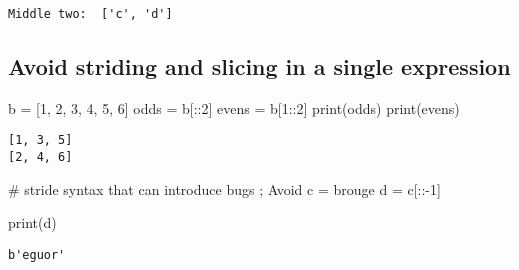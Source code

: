 \documentclass[
]{report}
\newenvironment{Shaded}{\begin{snugshade}}{\end{snugshade}}
\newcommand{\BuiltInTok}[1]{\textcolor[rgb]{0.00,0.23,0.31}{#1}}
\newcommand{\CommentTok}[1]{\textcolor[rgb]{0.37,0.37,0.37}{#1}}
\newcommand{\DecValTok}[1]{\textcolor[rgb]{0.68,0.00,0.00}{#1}}
\newcommand{\NormalTok}[1]{\textcolor[rgb]{0.00,0.23,0.31}{#1}}
\newcommand{\OperatorTok}[1]{\textcolor[rgb]{0.37,0.37,0.37}{#1}}
\newcommand{\StringTok}[1]{\textcolor[rgb]{0.13,0.47,0.30}{#1}}
\begin{document}
\begin{verbatim}
Middle two:  ['c', 'd']
\end{verbatim}

\hypertarget{avoid-striding-and-slicing-in-a-single-expression}{%
\subsection{Avoid striding and slicing in a single
expression}\label{avoid-striding-and-slicing-in-a-single-expression}}

\begin{Shaded}
\begin{Highlighting}[]
\NormalTok{b }\OperatorTok{=}\NormalTok{ [}\DecValTok{1}\NormalTok{, }\DecValTok{2}\NormalTok{, }\DecValTok{3}\NormalTok{, }\DecValTok{4}\NormalTok{, }\DecValTok{5}\NormalTok{, }\DecValTok{6}\NormalTok{]}
\NormalTok{odds }\OperatorTok{=}\NormalTok{ b[::}\DecValTok{2}\NormalTok{]}
\NormalTok{evens }\OperatorTok{=}\NormalTok{ b[}\DecValTok{1}\NormalTok{::}\DecValTok{2}\NormalTok{]}
\BuiltInTok{print}\NormalTok{(odds)}
\BuiltInTok{print}\NormalTok{(evens)}
\end{Highlighting}
\end{Shaded}

\begin{verbatim}
[1, 3, 5]
[2, 4, 6]
\end{verbatim}

\begin{Shaded}
\begin{Highlighting}[]
\CommentTok{\# stride syntax that can introduce bugs ; Avoid}
\NormalTok{c }\OperatorTok{=} \StringTok{b\textquotesingle{}rouge\textquotesingle{}}
\NormalTok{d }\OperatorTok{=}\NormalTok{ c[::}\OperatorTok{{-}}\DecValTok{1}\NormalTok{]}

\BuiltInTok{print}\NormalTok{(d)}
\end{Highlighting}
\end{Shaded}

\begin{verbatim}
b'eguor'
\end{verbatim}
\end{document}

